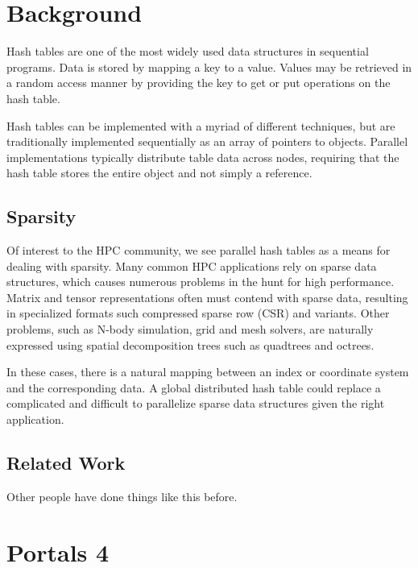 \section{Background}



Hash tables are one of the most widely used data
structures in sequential programs. Data is stored by mapping a key to
a value. Values may be retrieved in a random access manner by
providing the key to get or put operations on the hash table.

Hash tables can be implemented with a myriad of different techniques,
but are traditionally implemented sequentially as an array of pointers
to objects. Parallel implementations typically distribute table data
across nodes, requiring that the hash table stores the entire object
and not simply a reference.

\subsection{Sparsity}
Of interest to the HPC community, we see parallel hash tables as a
means for dealing with sparsity. Many common HPC applications rely on
sparse data structures, which causes numerous problems in the hunt for
high performance. Matrix and tensor representations often must contend
with sparse data, resulting in specialized formats such compressed
sparse row (CSR) and variants. Other problems, such as N-body
simulation, grid and mesh solvers, are naturally expressed using
spatial decomposition trees such as quadtrees and octrees. 

In these cases, there is a natural mapping between an index or
coordinate system and the corresponding data. A global distributed
hash table could replace a complicated and difficult to parallelize
sparse data structures given the right application.

\subsection{Related Work}

Other people have done things like this before.

\section{Portals 4}




